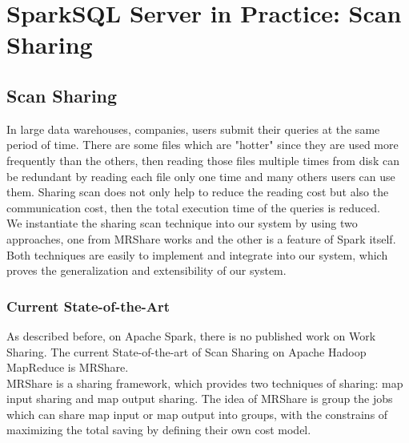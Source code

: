 
\chapter{SparkSQL Server in Practice: Scan Sharing} %

\label{Chapter4} %



\section{Scan Sharing}

In large data warehouses, companies, users submit their queries at the same period of time. There are some files which are "hotter" since they are used more frequently than the others, then reading those files multiple times from disk can be redundant by reading each file only one time and many others users can use them. Sharing scan does not only help to reduce the reading cost but also the communication cost, then the total execution time of the queries is reduced.\\

We instantiate the sharing scan technique into our system by using two approaches, one from MRShare \cite{nikiel2010} works and the other is a feature of Spark itself. Both techniques are easily to implement and integrate into our system, which proves the generalization and extensibility of our system.

\subsection{Current State-of-the-Art}

As described before,  on Apache Spark, there is no published work on Work Sharing. The current State-of-the-art of Scan Sharing on Apache Hadoop MapReduce is MRShare.\\
MRShare is a sharing framework, which provides two techniques of sharing: map input sharing and map output sharing. The idea of MRShare is group the jobs which can share map input or map output into groups, with the constrains of maximizing the total saving by defining their own cost model.\\

